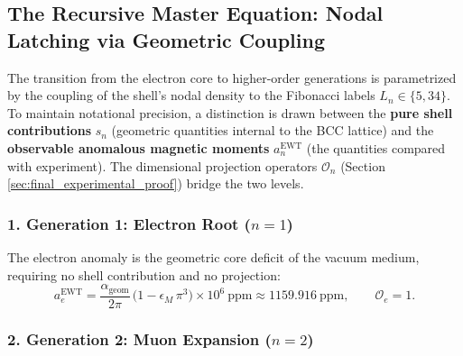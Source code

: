 \documentclass[10pt,a4paper]{article}
\begin{document}
\subsection{The Recursive Master Equation: Nodal Latching via Geometric Coupling}
\label{sec:recursive_math_final}

The transition from the electron core to higher-order generations is
parametrized by the coupling of the shell's nodal density to the Fibonacci
labels $L_n \in \{5, 34\}$. To maintain notational precision, a distinction is
drawn between the \textbf{pure shell contributions} $s_n$ (geometric quantities
internal to the BCC lattice) and the \textbf{observable anomalous magnetic
	moments} $a_n^{\text{EWT}}$ (the quantities compared with experiment). The
dimensional projection operators $\mathcal{O}_n$ (Section
\ref{sec:final_experimental_proof}) bridge the two levels.

\subsubsection*{1. Generation 1: Electron Root ($n=1$)}

The electron anomaly is the geometric core deficit of the vacuum medium,
requiring no shell contribution and no projection:
\begin{equation}
	a_e^{\text{EWT}}
	= \frac{\alpha_{\text{geom}}}{2\pi}\,\bigl(1 - \epsilon_M\,\pi^{3}\bigr)
	\times 10^{6}\ \text{ppm}
	\approx 1159.916\ \text{ppm},
	\qquad \mathcal{O}_e = 1.
	\label{eq:ae_master}
\end{equation}

\subsubsection*{2. Generation 2: Muon Expansion ($n=2$)}
\end{document}
